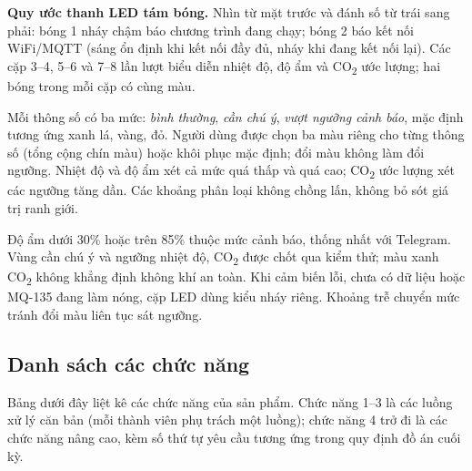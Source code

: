 \documentclass[12pt,a4paper]{article}
\begin{document}
\textbf{Quy ước thanh LED tám bóng.} Nhìn từ mặt trước và đánh số từ trái sang phải: bóng 1 nháy chậm báo chương trình đang chạy; bóng 2 báo kết nối WiFi/MQTT (sáng ổn định khi kết nối đầy đủ, nháy khi đang kết nối lại). Các cặp 3--4, 5--6 và 7--8 lần lượt biểu diễn nhiệt độ, độ ẩm và CO\textsubscript{2} ước lượng; hai bóng trong mỗi cặp có cùng màu.

Mỗi thông số có ba mức: \emph{bình thường}, \emph{cần chú ý}, \emph{vượt ngưỡng cảnh báo}, mặc định tương ứng xanh lá, vàng, đỏ. Người dùng được chọn ba màu riêng cho từng thông số (tổng cộng chín màu) hoặc khôi phục mặc định; đổi màu không làm đổi ngưỡng. Nhiệt độ và độ ẩm xét cả mức quá thấp và quá cao; CO\textsubscript{2} ước lượng xét các ngưỡng tăng dần. Các khoảng phân loại không chồng lấn, không bỏ sót giá trị ranh giới.

Độ ẩm dưới 30\% hoặc trên 85\% thuộc mức cảnh báo, thống nhất với Telegram. Vùng cần chú ý và ngưỡng nhiệt độ, CO\textsubscript{2} được chốt qua kiểm thử; màu xanh CO\textsubscript{2} không khẳng định không khí an toàn. Khi cảm biến lỗi, chưa có dữ liệu hoặc MQ-135 đang làm nóng, cặp LED dùng kiểu nháy riêng. Khoảng trễ chuyển mức tránh đổi màu liên tục sát ngưỡng.

\subsection{Danh sách các chức năng}
\label{sec:chucnang}
Bảng dưới đây liệt kê các chức năng của sản phẩm. Chức năng 1--3 là các luồng xử lý căn bản (mỗi thành viên phụ trách một luồng); chức năng 4 trở đi là các chức năng nâng cao, kèm số thứ tự yêu cầu tương ứng trong quy định đồ án cuối kỳ.
\end{document}

